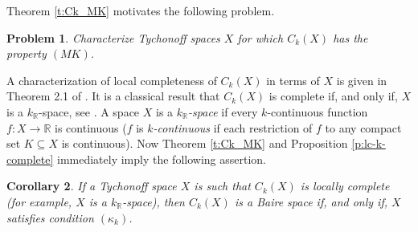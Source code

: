 \documentclass[preprint,11pt]{elsarticle}
\newtheorem{theorem}{Theorem}[section]
\newtheorem{corollary}[theorem]{Corollary}
\newtheorem{problem}[theorem]{Problem}
\theoremstyle{definition}
\theoremstyle{remark}
\numberwithin{equation}{section}
\numberwithin{theorem}{section}
\newcommand{\IR}{\mathbb{R}}
\newcommand{\CC}{C_k}
\begin{document}
Theorem \ref{t:Ck_MK} motivates the following problem.
\begin{problem}
Characterize Tychonoff spaces $X$ for which $\CC(X)$ has the property $(MK)$.
\end{problem}


A characterization of local completeness of $\CC(X)$ in terms of $X$ is given in Theorem 2.1 of \cite{Gabr-lc-Ck}. It is a classical result that $\CC(X)$ is complete if, and only if, $X$ is a $k_\IR$-space, see \cite[Corollary~5.1.2]{mcoy}. A space $X$ is a {\em $k_\IR$-space} if every $k$-continuous function $f:X\to\IR$ is continuous ($f$ is {\em $k$-continuous} if each restriction of $f$ to any compact set $K\subseteq X$ is continuous). Now Theorem \ref{t:Ck_MK} and Proposition \ref{p:lc-k-complete} immediately imply the following assertion.

\begin{corollary} \label{c:Ck-Baire-kR}
If a Tychonoff space $X$ is such that $\CC(X)$ is locally complete {\rm(}for example, $X$ is a $k_\IR$-space{\rm)}, then $\CC(X)$ is a Baire space if, and only if, $X$ satisfies condition  $(\kappa_k)$.
\end{corollary}



%




\end{document}
